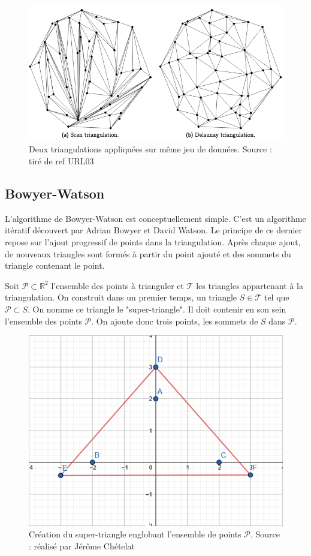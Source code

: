 \begin{figure}[htb!]
    \centering
    \includegraphics[width=0.8\linewidth]{figures/triangulation-example.png}
    \caption{Deux triangulations appliquées sur même jeu de données. Source : tiré de ref URL03}
    \label{fig:triangulation_example}
\end{figure}

\subsection{Bowyer-Watson}
L'algorithme de Bowyer-Watson est conceptuellement simple.
C'est un algorithme itératif découvert par Adrian Bowyer et David Watson.
Le principe de ce dernier repose sur l’ajout progressif de points dans la triangulation.
Après chaque ajout, de nouveaux triangles sont formés à partir du point ajouté et des sommets du triangle contenant le point.

Soit $\mathcal{P} \subset \mathbb{R}^2$ l'ensemble des points à trianguler et $\mathcal{T}$ les triangles appartenant à la triangulation.
On construit dans un premier temps, un triangle $S \in \mathcal{T}$ tel que $\mathcal{P} \subset S$.
On nomme ce triangle le "super-triangle".
Il doit contenir en son sein l'ensemble des points $\mathcal{P}$. On ajoute donc trois points, les sommets de $S$ dans $\mathcal{P}$.

\begin{figure}[htbp!]
    \centering
    \includegraphics[width=0.66\linewidth]{figures/bowyer-watson/step_3.png}
	\caption{Création du super-triangle englobant l'ensemble de points $\mathcal{P}$. Source : réalisé par
	Jérôme Chételat}
	\label{fig:triangulation_step_3}
\end{figure}

